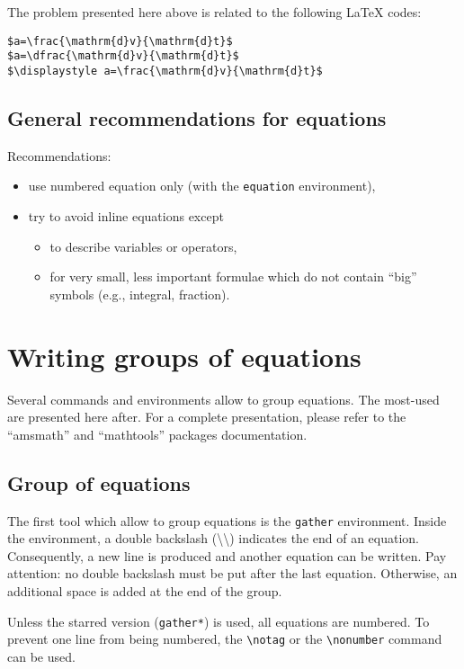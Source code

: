 		The problem presented here above is related to the following \LaTeX{} codes:
\begin{lstlisting}[language={[LaTeX]TeX}]
$a=\frac{\mathrm{d}v}{\mathrm{d}t}$
$a=\dfrac{\mathrm{d}v}{\mathrm{d}t}$
$\displaystyle a=\frac{\mathrm{d}v}{\mathrm{d}t}$
\end{lstlisting}
		
	
	\subsection{General recommendations for equations}
		
		Recommendations:
		\begin{itemize}
			\item use numbered equation only (with the \texttt{equation} environment),
			\item try to avoid inline equations except
			\begin{itemize}
				\item to describe variables or operators,
				\item for very small, less important formulae which do not contain \enquote{big} symbols (e.g., integral, fraction).
			\end{itemize}
		\end{itemize}
	
	
\section{Writing groups of equations}

	Several commands and environments allow to group equations.
	The most-used are presented here after.
	For a complete presentation, please refer to the \enquote{amsmath} and \enquote{mathtools} packages documentation.
	
	
	\subsection{Group of equations}
	
		The first tool which allow to group equations is the \texttt{gather} environment.
		Inside the environment, a double backslash (\textbackslash\textbackslash) indicates the end of an equation.
		Consequently, a new line is produced and another equation can be written.
		Pay attention: no double backslash must be put after the last equation.
		Otherwise, an additional space is added at the end of the group.
		
		Unless the starred version (\texttt{gather*}) is used, all equations are numbered.
		To prevent one line from being numbered, the \texttt{\textbackslash{}notag} or the \texttt{\textbackslash{}nonumber} command can be used.
		
